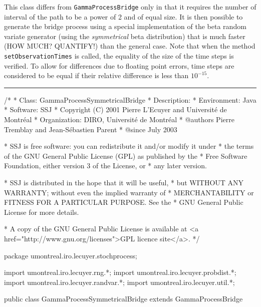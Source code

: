 
This class differs from \texttt{GammaProcessBridge} only in that it requires
the number of interval of the path to be
a power of 2 and of equal size.
It is then possible to generate the bridge process using
a special implementation of the beta random variate generator
(using the \emph{symmetrical} beta distribution)
that is much faster (HOW MUCH? QUANTIFY!) than the general case.
Note that when the method \texttt{setObservationTimes} is called,
the equality of the size of the time steps is verified.
To allow for differences due to floating point errors, time steps
are considered to be equal if their relative difference is less
than $10^{-15}$.
\bigskip\hrule\bigskip

\begin{code}
\begin{hide}
/*
 * Class:        GammaProcessSymmetricalBridge
 * Description:  
 * Environment:  Java
 * Software:     SSJ 
 * Copyright (C) 2001  Pierre L'Ecuyer and Université de Montréal
 * Organization: DIRO, Université de Montréal
 * @authors      Pierre Tremblay and Jean-Sébastien Parent
 * @since        July 2003

 * SSJ is free software: you can redistribute it and/or modify it under
 * the terms of the GNU General Public License (GPL) as published by the
 * Free Software Foundation, either version 3 of the License, or
 * any later version.

 * SSJ is distributed in the hope that it will be useful,
 * but WITHOUT ANY WARRANTY; without even the implied warranty of
 * MERCHANTABILITY or FITNESS FOR A PARTICULAR PURPOSE.  See the
 * GNU General Public License for more details.

 * A copy of the GNU General Public License is available at
   <a href="http://www.gnu.org/licenses">GPL licence site</a>.
 */
\end{hide}
package umontreal.iro.lecuyer.stochprocess;\begin{hide}
import umontreal.iro.lecuyer.rng.*;
import umontreal.iro.lecuyer.probdist.*;
import umontreal.iro.lecuyer.randvar.*;
import umontreal.iro.lecuyer.util.*;

\end{hide}

public class GammaProcessSymmetricalBridge extends GammaProcessBridge \begin{hide} {
    protected BetaSymmetricalGen BSgen;
\end{hide}
\end{code}
